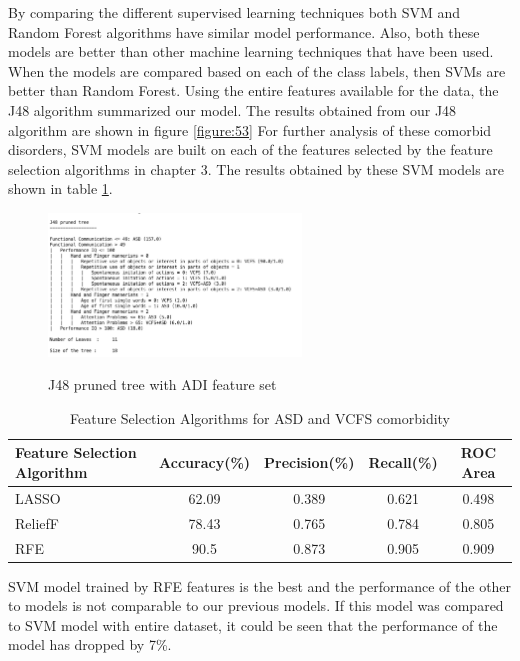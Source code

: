 By comparing the different supervised learning techniques both SVM and Random Forest algorithms have similar model performance. Also, both these models are better than other machine learning techniques that have been used. When the models are compared based on each of the class labels, then SVMs are better than Random Forest. Using the entire features available for the data, the J48 algorithm summarized our model. The results obtained from our J48 algorithm are shown in figure \ref{figure:53} For further analysis of these comorbid disorders, SVM models are built on each of the features selected by the feature selection algorithms in chapter 3. The results obtained by these SVM models are shown in table \ref{table:57}.
\begin{figure}
\centering
  {\includegraphics[width=0.6\textwidth]{Figures/Figure_5_3.png}}
  \caption{J48 pruned tree with ADI feature set}
  \label{fig:53}
\end{figure}
\begin{table}[h]
\begin{center}
\begin{tabular}{|l|c|c|c|c|}
\hline
\textbf{Feature Selection Algorithm}& \textbf{Accuracy(\%)}&	\textbf{Precision(\%)}&	\textbf{Recall(\%)}&	\textbf{ROC Area}\\
\hline \hline
LASSO&	62.09&	0.389&	0.621&	0.498\\
\hline
ReliefF&	78.43&	0.765&	0.784&	0.805\\
\hline
RFE&	90.5&	0.873&	0.905&	0.909\\
\hline
\end{tabular}
\end{center}
\caption{Feature Selection Algorithms for ASD and VCFS comorbidity}
\label{table:57}
\end{table}

SVM model trained by RFE features is the best and the performance of the other to models is not comparable to our previous models. If this model was compared to SVM model with entire dataset, it could be seen that the performance of the model has dropped by 7\%.

